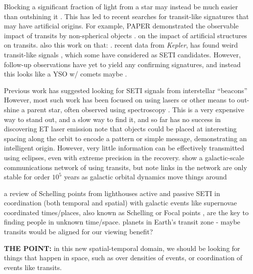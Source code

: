 \documentclass[modern]{aastex62}
\newcommand{\Kepler}{\textsl{Kepler}\xspace}
\begin{document}
Blocking a significant fraction of light from a star may instead be much easier than outshining it \cite{arnold2005}. This has led to recent searches for transit-like signatures that may have artificial origins. For example, PAPER demonstrated the observable impact of transits by non-spherical objects \cite{arnold2005a}.
on the impact of artificial structures on transits. also this work on that:
\cite{wright2016}.
recent data from \Kepler \citep{borucki2010}, has found weird transit-like signals
\cite{boyajian2015}, 
which some have considered as SETI candidates. However, follow-up observations have yet to yield any confirming signatures, and instead this looks like a YSO w/ comets maybe \citep{lisse2015}.


Previous work has suggested looking for SETI signals from interstellar ``beacons''
\cite{benford2008}
However, most such work has been focused on using lasers or other means to out-shine a parent star, often observed using spectroscopy \cite{reines2002}. This is a very expensive way to stand out, and a slow way to find it, and so far has no success in discovering ET laser emission \cite{tellis2015}
\cite{arnold2005} note that objects could be placed at interesting spacing along the orbit to encode a pattern or simple message, demonstrating an intelligent origin. However, very little information can be effectively transmitted using eclipses, even with extreme precision in the recovery.
\cite{forgan2017} show a galactic-scale communications network of using transits, but note links in the network are only stable for order $10^5$ years as galactic orbital dynamics move things around





a review of Schelling points from \citet{wright2017}
lighthouses \citep{zuluaga2015}
active and passive SETI in coordination (both temporal and spatial) with galactic events like supernovae 
\citep{lemarchand1994}
coordinated times/places, also known as Schelling or Focal points \citep{schelling1960}, are the key to finding people in unknown time/space.
planets in Earth's transit zone \cite{heller2016} - maybe transits would be aligned for our viewing benefit?




{\bf THE POINT: } in this new spatial-temporal domain, we should be looking for things that happen in space, such as over densities of events, or coordination of events like transits.
\end{document}
